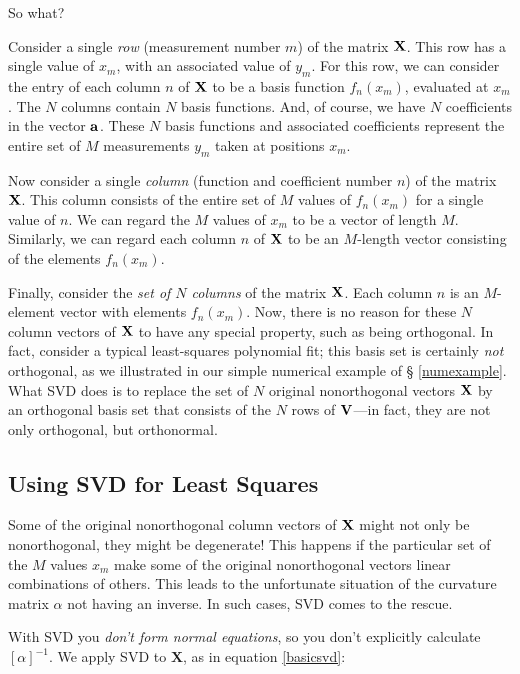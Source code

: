 \documentclass[psfig,preprint]{aastex}
\begin{document}
\noindent So what?

Consider a single {\it row} (measurement number $m$) of the matrix $\bf
X$. This row has a single value of $x_m$, with an associated value of
$y_m$. For this row, we can consider the entry of each column $n$ of
$\bf X$ to be a basis function $f_n(x_m)$, evaluated at $x_m$. The $N$
columns contain $N$ basis functions. And, of course, we have $N$
coefficients in the vector $\bf a$. These $N$ basis functions and
associated coefficients represent the entire set of $M$ measurements
$y_m$ taken at positions $x_m$.

Now consider a single {\it column} (function and coefficient number $n$)
of the matrix $\bf X$. This column consists of the entire set of $M$
values of $f_n(x_m)$ for a single value of $n$. We can regard the $M$
values of $x_m$ to be a vector of length $M$. Similarly, we can regard
each column $n$ of $\bf X$ to be an $M$-length vector consisting of the
elements $f_n(x_m)$.

Finally, consider the {\it set of $N$ columns} of the matrix $\bf
X$. Each column $n$ is an $M$-element vector with elements $f_n(x_m)$.
Now, there is no reason for these $N$ column vectors of $\bf X$ to have
any special property, such as being orthogonal. In fact, consider a
typical least-squares polynomial fit; this basis set is certainly {\it
not} orthogonal, as we illustrated in our simple numerical example of \S
\ref{numexample}.  What SVD does is to replace the set of $N$ original
nonorthogonal vectors $\bf X$ by an orthogonal basis set that consists
of the $N$ rows of $\bf V$---in fact, they are not only orthogonal, but
orthonormal.

\subsection{Using SVD for Least Squares} \label{nonsquare}

Some of the original nonorthogonal column vectors of ${\bf X}$ might
not only be nonorthogonal, they might be degenerate! This happens if the
particular set of the $M$ values $x_m$ make some of the original
nonorthogonal vectors linear combinations of others. This leads to the
unfortunate situation of the curvature matrix $\alpha$ not having an
inverse. In such cases, SVD comes to the rescue.


With SVD you {\it don't form normal equations}, so you don't explicitly
calculate $[\alpha]^{-1}$. We apply SVD to $\mathbf X$, as in equation
\ref{basicsvd}:
\end{document}
